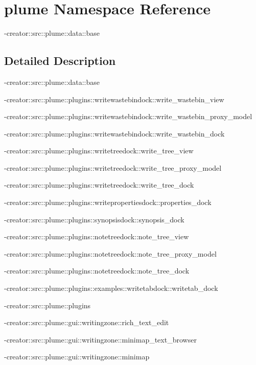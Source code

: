\hypertarget{namespaceplume}{}\section{plume Namespace Reference}
\label{namespaceplume}


-\/creator\+::src\+::plume\+::data\+::base  




\subsection{Detailed Description}
-\/creator\+::src\+::plume\+::data\+::base 

-\/creator\+::src\+::plume\+::plugins\+::writewastebindock\+::write\+\_\+wastebin\+\_\+view

-\/creator\+::src\+::plume\+::plugins\+::writewastebindock\+::write\+\_\+wastebin\+\_\+proxy\+\_\+model

-\/creator\+::src\+::plume\+::plugins\+::writewastebindock\+::write\+\_\+wastebin\+\_\+dock

-\/creator\+::src\+::plume\+::plugins\+::writetreedock\+::write\+\_\+tree\+\_\+view

-\/creator\+::src\+::plume\+::plugins\+::writetreedock\+::write\+\_\+tree\+\_\+proxy\+\_\+model

-\/creator\+::src\+::plume\+::plugins\+::writetreedock\+::write\+\_\+tree\+\_\+dock

-\/creator\+::src\+::plume\+::plugins\+::writepropertiesdock\+::properties\+\_\+dock

-\/creator\+::src\+::plume\+::plugins\+::synopsisdock\+::synopsis\+\_\+dock

-\/creator\+::src\+::plume\+::plugins\+::notetreedock\+::note\+\_\+tree\+\_\+view

-\/creator\+::src\+::plume\+::plugins\+::notetreedock\+::note\+\_\+tree\+\_\+proxy\+\_\+model

-\/creator\+::src\+::plume\+::plugins\+::notetreedock\+::note\+\_\+tree\+\_\+dock

-\/creator\+::src\+::plume\+::plugins\+::examples\+::writetabdock\+::writetab\+\_\+dock

-\/creator\+::src\+::plume\+::plugins

-\/creator\+::src\+::plume\+::gui\+::writingzone\+::rich\+\_\+text\+\_\+edit

-\/creator\+::src\+::plume\+::gui\+::writingzone\+::minimap\+\_\+text\+\_\+browser

-\/creator\+::src\+::plume\+::gui\+::writingzone\+::minimap

